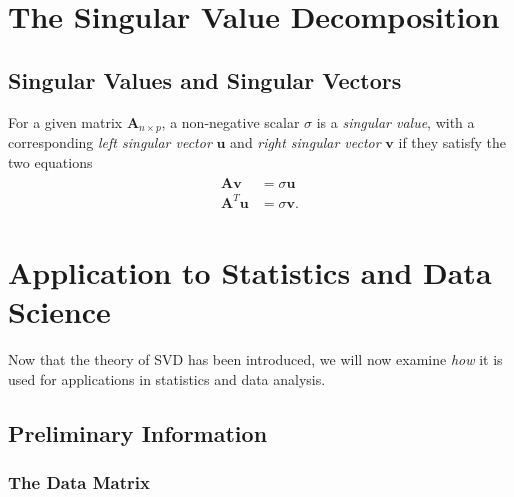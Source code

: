 \documentclass[10pt]{article}
\newcommand{\mydef}[1]{\textcolor{SteelBlue3}{\textit{#1}}} %
\begin{document}





\section{The Singular Value Decomposition}

\subsection{Singular Values and Singular Vectors}

For a given matrix $\mathbf{A}_{n \times p}$, a non-negative scalar $\sigma$ is a \mydef{singular value}, with a corresponding \mydef{left singular vector} $\mathbf{u}$ and \mydef{right singular vector} $\mathbf{v}$ if they satisfy the two equations 
\begin{align}
    \label{singularvalues}
    \begin{split}
        \mathbf{A} \mathbf{v} &= \sigma \mathbf{u} \\
        \mathbf{A}^T \mathbf{u} &= \sigma \mathbf{v}.
    \end{split}
\end{align}



\section{Application to Statistics and Data Science}

Now that the theory of SVD has been introduced, we will now examine \textit{how} it is used for applications in statistics and data analysis. 

\subsection{Preliminary Information}

\subsubsection{The Data Matrix}
\end{document}
